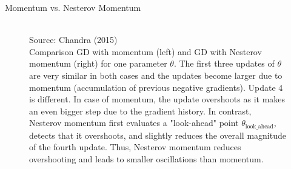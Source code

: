 \documentclass[11pt,compress,t,notes=noshow, xcolor=table]{beamer}
\begin{document}
\begin{vbframe}{Momentum vs. Nesterov Momentum}
	\begin{figure}
		\vspace{-0.3cm}
		
		\centering
		\tiny{\\Source: Chandra (2015) \\}
		\footnotesize{Comparison GD with momentum (left) and GD with Nesterov momentum (right) for one parameter $\theta$. The first three updates of $\theta$ are very similar in both cases and the updates become larger due to momentum (accumulation of previous negative gradients). Update 4 is different. In case of momentum, the update overshoots as it makes an even bigger step due to the gradient history. In contrast, Nesterov momentum first evaluates a "look-ahead" point $\theta_{\text{look\_ahead}}$, detects that it overshoots, and slightly reduces the overall magnitude of the fourth update. Thus, Nesterov momentum reduces overshooting and leads to smaller oscillations than momentum. }
	\end{figure}
\end{vbframe}



\endlecture
\end{document}
